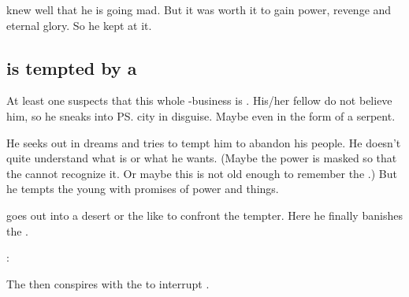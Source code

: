 
\Semiza{} knew well that he is going mad. 
But it was worth it to gain power, revenge and eternal glory.
So he kept at it.









\subsection{\Thanatzil{} is tempted by a \dragon}
At least one \dragon{} suspects that this whole \Thanatzil-business is . His/her fellow \dragons{} do not believe him, so he sneaks into \ps{\Semiza}{} city in disguise. Maybe even in the form of a serpent. 

He seeks out \Thanatzil{} in dreams and tries to tempt him to abandon his people. He doesn't quite understand what \Thanatzil{} is or what he wants. (Maybe the \bane{} power is masked so that the \dragons{} cannot recognize it. Or maybe this \dragon{} is not old enough to remember the \firstbanewar.) But he tempts the young \resphan{} with promises of power and things. 

\Thanatzil{} goes out into a desert or the like to confront the tempter. Here he finally banishes the \dragon. 

\Thanatzil: 

The \dragon{} then conspires with the  to interrupt . 















